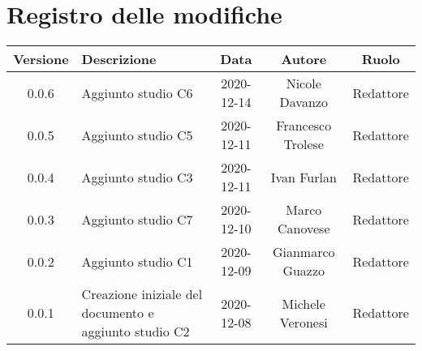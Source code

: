 \section*{Registro delle modifiche}

\begin{center}
	\begin{longtable}{|c|p{5cm}|c|c|c|}
	\hline
	\rowcolor{lighter-grayer}
	\textbf{Versione} & \textbf{Descrizione} & \textbf{Data} & \textbf{Autore} & \textbf{Ruolo} \\
	\hline
	\endfirsthead


	\hline
	0.0.6 & Aggiunto studio C6 & 2020-12-14 & Nicole Davanzo & Redattore \\
	0.0.5 & Aggiunto studio C5 & 2020-12-11 & Francesco Trolese & Redattore \\
	0.0.4 & Aggiunto studio C3 & 2020-12-11 & Ivan Furlan & Redattore \\
	0.0.3 & Aggiunto studio C7 & 2020-12-10 & Marco Canovese & Redattore \\
	0.0.2 & Aggiunto studio C1 & 2020-12-09 & Gianmarco Guazzo & Redattore\\
    0.0.1 & Creazione iniziale del documento e aggiunto studio C2 & 2020-12-08 & Michele Veronesi & Redattore\\
	\hline

	\end{longtable}
\end{center}